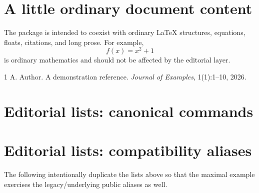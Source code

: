\documentclass[11pt]{article}
\begin{document}
\section{A little ordinary document content}

The package is intended to coexist with ordinary LaTeX structures, equations,
floats, citations, and long prose. For example,
\[
  f(x)=x^2+1
\]
is ordinary mathematics and should not be affected by the editorial layer.

\lipsum[2]

\begin{thebibliography}{1}
A. Author.
\newblock A demonstration reference.
\newblock \emph{Journal of Examples}, 1(1):1--10, 2026.
\end{thebibliography}

\clearpage
\section*{Editorial lists: canonical commands}

\listofcomments
\listofcitationneeds
\listofsubjects

\clearpage
\section*{Editorial lists: compatibility aliases}

The following intentionally duplicate the lists above so that the maximal
example exercises the legacy/underlying public aliases as well.

\listofcomentario
\listofcomentarioref
\listofsubject
\listofassunto
\end{document}
